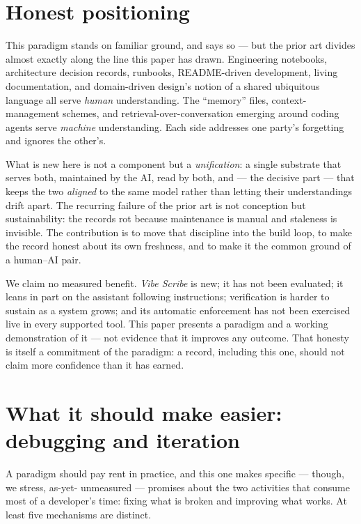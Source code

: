 \documentclass[11pt]{article}
\newcommand{\vs}{\textit{Vibe Scribe}}
\begin{document}
\section{Honest positioning}

This paradigm stands on familiar ground, and says so --- but the prior art divides almost exactly
along the line this paper has drawn. Engineering notebooks, architecture decision records, runbooks,
README-driven development, living documentation, and domain-driven design's notion of a shared
ubiquitous language all serve \emph{human} understanding. The ``memory'' files, context-management
schemes, and retrieval-over-conversation emerging around coding agents serve \emph{machine}
understanding. Each side addresses one party's forgetting and ignores the other's.

What is new here is not a component but a \emph{unification}: a single substrate that serves both,
maintained by the AI, read by both, and --- the decisive part --- that keeps the two \emph{aligned}
to the same model rather than letting their understandings drift apart. The recurring failure of the
prior art is not conception but sustainability: the records rot because maintenance is manual and
staleness is invisible. The contribution is to move that discipline into the build loop, to make the
record honest about its own freshness, and to make it the common ground of a human--AI pair.

We claim no measured benefit. \vs{} is new; it has not been evaluated; it leans in part on the
assistant following instructions; verification is harder to sustain as a system grows; and its
automatic enforcement has not been exercised live in every supported tool. This paper presents a
paradigm and a working demonstration of it --- not evidence that it improves any outcome. That
honesty is itself a commitment of the paradigm: a record, including this one, should not claim more
confidence than it has earned.

\section{What it should make easier: debugging and iteration}

A paradigm should pay rent in practice, and this one makes specific --- though, we stress, as-yet-%
unmeasured --- promises about the two activities that consume most of a developer's time: fixing what
is broken and improving what works. At least five mechanisms are distinct.
\end{document}
